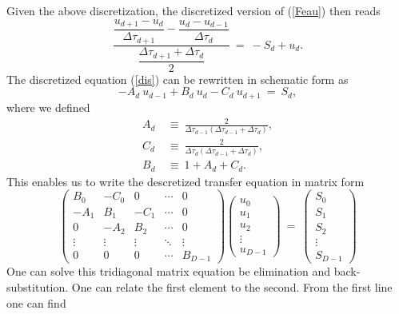 \documentclass[]{article}
\begin{document}
Given the above discretization, the discretized version of (\ref{Feau}) then reads
\begin{equation}
\frac{\dfrac{u_{d+1}-u_{d}}{\Delta\tau_{d+1}}-\dfrac{u_{d}-u_{d-1}}{\Delta\tau_{d}}}{\dfrac{\Delta\tau_{d+1}+\Delta\tau_{d}}{2}} \ = \ - S_{d} + u_{d} .
\label{dis}
\end{equation}
The discretized equation (\ref{dis}) can be rewritten in schematic form as
\begin{equation}
-A_{d} \ u_{d-1} + B_{d} \ u_{d} - C_{d} \ u_{d+1} \ = \ S_{d},
\label{rec}
\end{equation}
where we defined
\begin{equation}
\begin{split}
A_{d} \ &\equiv \ \frac{2}{\Delta\tau_{d-1} (\Delta\tau_{d-1} + \Delta\tau_{d}) } , \\
C_{d} \ &\equiv \ \frac{2}{\Delta\tau_{d} (\Delta\tau_{d-1} + \Delta\tau_{d})} , \\
B_{d} \ &\equiv \ 1  + A_{d} + C_{d} .
\end{split}
\end{equation}
This enables us to write the descretized transfer equation in matrix form
\begin{equation}
\left( \begin{matrix}
B_{0} & -C_{0} & 0 & \cdots & 0 \\
-A_{1} & B_{1} & -C_{1} & \cdots & 0 \\
0 & -A_{2} & B_{2} & \cdots & 0 \\
\vdots & \vdots & \vdots & \ddots & \vdots \\
0 & 0 & 0 & \cdots & B_{D-1}
\end{matrix}\right)
\left( \begin{matrix}
u_{0} \\ u_{1} \\ u_{2} \\ \vdots \\ u_{D-1}
\end{matrix}\right) \ = \ \left( \begin{matrix}
S_{0} \\ S_{1} \\ S_{2} \\ \vdots \\ S_{D-1}
\end{matrix}\right)
\label{mateq}
\end{equation}
One can solve this tridiagonal matrix equation be elimination and back-substitution. One can relate the first element to the second. From the first line one can find
\end{document}
